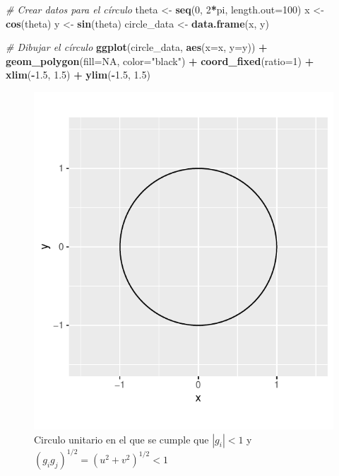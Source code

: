 \documentclass[
]{book}
\newenvironment{Shaded}{\begin{snugshade}}{\end{snugshade}}
\newcommand{\AttributeTok}[1]{\textcolor[rgb]{0.13,0.29,0.53}{#1}}
\newcommand{\CommentTok}[1]{\textcolor[rgb]{0.56,0.35,0.01}{\textit{#1}}}
\newcommand{\ConstantTok}[1]{\textcolor[rgb]{0.56,0.35,0.01}{#1}}
\newcommand{\DecValTok}[1]{\textcolor[rgb]{0.00,0.00,0.81}{#1}}
\newcommand{\FloatTok}[1]{\textcolor[rgb]{0.00,0.00,0.81}{#1}}
\newcommand{\FunctionTok}[1]{\textcolor[rgb]{0.13,0.29,0.53}{\textbf{#1}}}
\newcommand{\NormalTok}[1]{#1}
\newcommand{\OtherTok}[1]{\textcolor[rgb]{0.56,0.35,0.01}{#1}}
\newcommand{\SpecialCharTok}[1]{\textcolor[rgb]{0.81,0.36,0.00}{\textbf{#1}}}
\newcommand{\StringTok}[1]{\textcolor[rgb]{0.31,0.60,0.02}{#1}}
\begin{document}
\begin{Shaded}
\begin{Highlighting}[]
\CommentTok{\# Crear datos para el círculo}
\NormalTok{theta }\OtherTok{\textless{}{-}} \FunctionTok{seq}\NormalTok{(}\DecValTok{0}\NormalTok{, }\DecValTok{2}\SpecialCharTok{*}\NormalTok{pi, }\AttributeTok{length.out=}\DecValTok{100}\NormalTok{)}
\NormalTok{x }\OtherTok{\textless{}{-}} \FunctionTok{cos}\NormalTok{(theta)}
\NormalTok{y }\OtherTok{\textless{}{-}} \FunctionTok{sin}\NormalTok{(theta)}
\NormalTok{circle\_data }\OtherTok{\textless{}{-}} \FunctionTok{data.frame}\NormalTok{(x, y)}

\CommentTok{\# Dibujar el círculo}
\FunctionTok{ggplot}\NormalTok{(circle\_data, }\FunctionTok{aes}\NormalTok{(}\AttributeTok{x=}\NormalTok{x, }\AttributeTok{y=}\NormalTok{y)) }\SpecialCharTok{+}
  \FunctionTok{geom\_polygon}\NormalTok{(}\AttributeTok{fill=}\ConstantTok{NA}\NormalTok{, }\AttributeTok{color=}\StringTok{"black"}\NormalTok{) }\SpecialCharTok{+}
  \FunctionTok{coord\_fixed}\NormalTok{(}\AttributeTok{ratio=}\DecValTok{1}\NormalTok{) }\SpecialCharTok{+}
  \FunctionTok{xlim}\NormalTok{(}\SpecialCharTok{{-}}\FloatTok{1.5}\NormalTok{, }\FloatTok{1.5}\NormalTok{) }\SpecialCharTok{+}
  \FunctionTok{ylim}\NormalTok{(}\SpecialCharTok{{-}}\FloatTok{1.5}\NormalTok{, }\FloatTok{1.5}\NormalTok{)}
\end{Highlighting}
\end{Shaded}

\begin{figure}

{\centering \includegraphics{Notas-Series-Tiempo_files/figure-latex/fig24-1} 

}

\caption{Circulo unitario en el que se cumple que $|g_i|<1$ y $(g_i g_j)^{1/2} = (u^2 + v^2)^{1/2} < 1$}\label{fig:fig24}
\end{figure}
\end{document}
